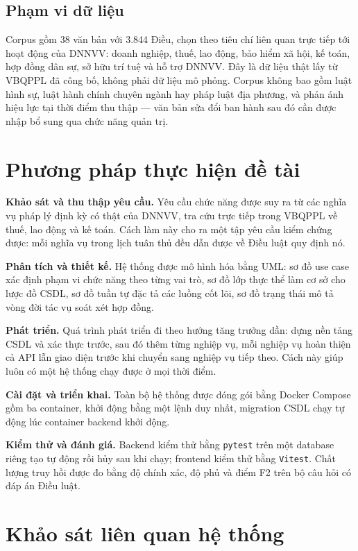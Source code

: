 \documentclass[12pt,a4paper]{report}
\numberwithin{equation}{chapter}
\numberwithin{figure}{chapter}
\numberwithin{table}{chapter}
\newcommand{\soLuat}{38}
\newcommand{\soDieu}{3.844}
\begin{document}
\subsection{Phạm vi dữ liệu}
Corpus gồm \soLuat{} văn bản với \soDieu{} Điều, chọn theo tiêu chí liên quan
trực tiếp tới hoạt động của DNNVV: doanh nghiệp, thuế, lao động, bảo hiểm xã hội,
kế toán, hợp đồng dân sự, sở hữu trí tuệ và hỗ trợ DNNVV. Đây là dữ liệu thật lấy
từ VBQPPL đã công bố, không phải dữ liệu mô phỏng. Corpus không bao gồm luật hình
sự, luật hành chính chuyên ngành hay pháp luật địa phương, và phản ánh hiệu lực
tại thời điểm thu thập --- văn bản sửa đổi ban hành sau đó cần được nhập bổ sung
qua chức năng quản trị.

\section{Phương pháp thực hiện đề tài}

\textbf{Khảo sát và thu thập yêu cầu.} Yêu cầu chức năng được suy ra từ các nghĩa
vụ pháp lý định kỳ có thật của DNNVV, tra cứu trực tiếp trong VBQPPL về thuế, lao
động và kế toán. Cách làm này cho ra một tập yêu cầu kiểm chứng được: mỗi nghĩa vụ
trong lịch tuân thủ đều dẫn được về Điều luật quy định nó.

\textbf{Phân tích và thiết kế.} Hệ thống được mô hình hóa bằng UML: sơ đồ use case
xác định phạm vi chức năng theo từng vai trò, sơ đồ lớp thực thể làm cơ sở cho
lược đồ CSDL, sơ đồ tuần tự đặc tả các luồng cốt lõi, sơ đồ trạng thái mô tả vòng
đời tác vụ soát xét hợp đồng.

\textbf{Phát triển.} Quá trình phát triển đi theo hướng tăng trưởng dần: dựng nền
tảng CSDL và xác thực trước, sau đó thêm từng nghiệp vụ, mỗi nghiệp vụ hoàn thiện
cả API lẫn giao diện trước khi chuyển sang nghiệp vụ tiếp theo. Cách này giúp
luôn có một hệ thống chạy được ở mọi thời điểm.

\textbf{Cài đặt và triển khai.} Toàn bộ hệ thống được đóng gói bằng Docker
Compose gồm ba container, khởi động bằng một lệnh duy nhất, migration CSDL chạy
tự động lúc container backend khởi động.

\textbf{Kiểm thử và đánh giá.} Backend kiểm thử bằng \texttt{pytest} trên một
database riêng tạo tự động rồi hủy sau khi chạy; frontend kiểm thử bằng
\texttt{Vitest}. Chất lượng truy hồi được đo bằng độ chính xác, độ phủ và điểm
F2 trên bộ câu hỏi có đáp án Điều luật.

\section{Khảo sát liên quan hệ thống}
\end{document}
